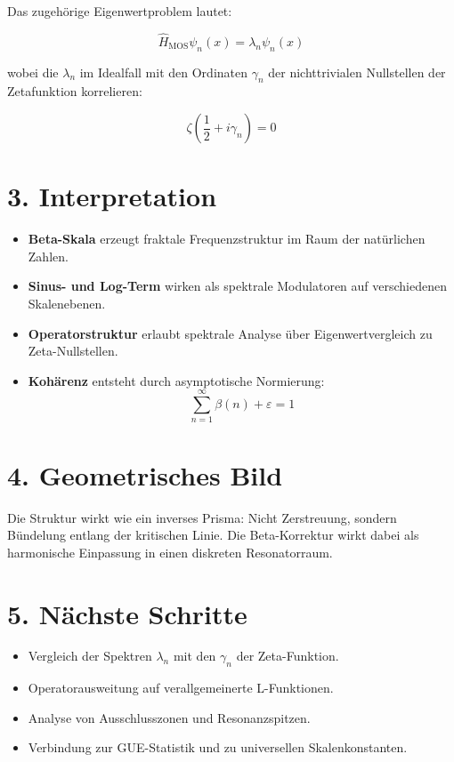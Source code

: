\documentclass[12pt]{article}
\begin{document}
Das zugehörige Eigenwertproblem lautet:

\[
\hat{H}_{\text{MOS}} \psi_n(x) = \lambda_n \psi_n(x)
\]

wobei die \(\lambda_n\) im Idealfall mit den Ordinaten \(\gamma_n\) der nichttrivialen Nullstellen der Zetafunktion korrelieren:

\[
\zeta\left(\frac{1}{2} + i \gamma_n\right) = 0
\]

\section*{3. Interpretation}

\begin{itemize}
  \item \textbf{Beta-Skala} erzeugt fraktale Frequenzstruktur im Raum der natürlichen Zahlen.
  \item \textbf{Sinus- und Log-Term} wirken als spektrale Modulatoren auf verschiedenen Skalenebenen.
  \item \textbf{Operatorstruktur} erlaubt spektrale Analyse über Eigenwertvergleich zu Zeta-Nullstellen.
  \item \textbf{Kohärenz} entsteht durch asymptotische Normierung:
  \[
  \sum_{n=1}^{\infty} \beta(n) + \varepsilon = 1
  \]
\end{itemize}

\section*{4. Geometrisches Bild}

Die Struktur wirkt wie ein inverses Prisma:  
Nicht Zerstreuung, sondern Bündelung entlang der kritischen Linie.  
Die Beta-Korrektur wirkt dabei als harmonische Einpassung in einen diskreten Resonatorraum.

\section*{5. Nächste Schritte}

\begin{itemize}
  \item Vergleich der Spektren \(\lambda_n\) mit den \(\gamma_n\) der Zeta-Funktion.
  \item Operatorausweitung auf verallgemeinerte L-Funktionen.
  \item Analyse von Ausschlusszonen und Resonanzspitzen.
  \item Verbindung zur GUE-Statistik und zu universellen Skalenkonstanten.
\end{itemize}
\end{document}
